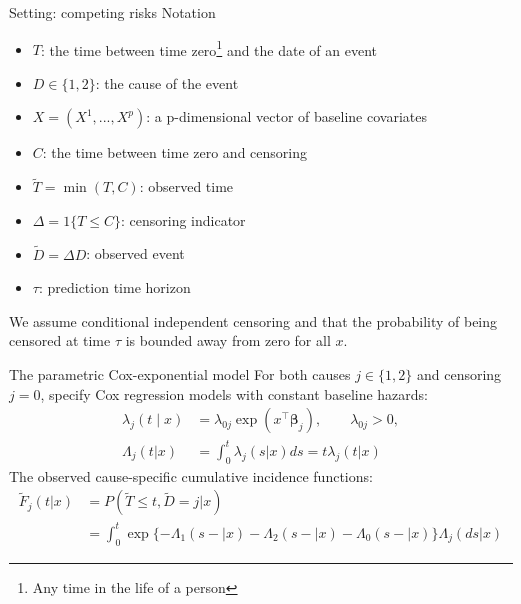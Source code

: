 \documentclass{beamer}\usepackage{listings}
\begin{document}
\begin{frame}[label={sec:org9219975}]{Setting: competing risks}
Notation
\vfill
\begin{itemize}
\item \(T\): the time between time zero\footnote{Any time in the life of a person} and the date of an event
\item \(D\in\{1,2\}\): the cause of the event
\item \(X = (X^1,...,X^p)\): a p-dimensional vector of baseline covariates
\item \(C\): the time between time zero and censoring
\item \(\widetilde{T} = \min(T,C)\): observed time
\item \(\Delta = 1\{T\leq C\}\): censoring indicator
\item \(\widetilde{D} = \Delta D\): observed event
\item \(\tau\): prediction time horizon
\end{itemize}


 \vfill
We assume conditional independent censoring and that the probability of being censored at time \(\tau\) is bounded away from zero for all \(x\). 
\end{frame}


\begin{frame}[label={sec:org65ac301}]{The parametric Cox-exponential model}
For both causes \(j\in\{1,2\}\) and censoring \(j = 0\), specify Cox regression models with constant baseline hazards:
\begin{align*}
\lambda_j(t\mid x) &=\lambda_{0j}\exp(x^\top\boldsymbol{\beta}_j),\qquad \lambda_{0j}>0,\\
\Lambda_j(t|x) &= \int^t_0\lambda_j(s|x)ds = t\lambda_j(t|x)
\end{align*}
\pause
The observed cause-specific cumulative incidence functions:
\begin{align*}
\widetilde{F}_j(t|x) &= P(\widetilde{T}\leq t, \widetilde{D} = j|x)\\
&= \int_0^t \exp\{-\Lambda_1(s-|x)-\Lambda_2(s-|x)-\Lambda_0(s-|x)\}\Lambda_j(ds|x)
\end{align*}
\end{frame}
\end{document}
